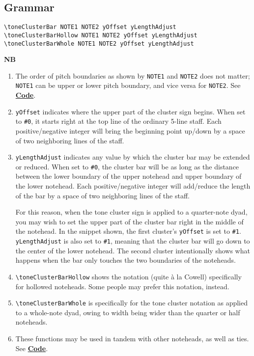 \subsection{Grammar}
\begin{verbatim}
\toneClusterBar NOTE1 NOTE2 yOffset yLengthAdjust
\toneClusterBarHollow NOTE1 NOTE2 yOffset yLengthAdjust
\toneClusterBarWhole NOTE1 NOTE2 yOffset yLengthAdjust
\end{verbatim}
\textbf{NB} \begin{enumerate}
\item The order of pitch boundaries as shown by \verb|NOTE1| and \verb|NOTE2| does not matter; \verb|NOTE1| can be upper or lower pitch boundary, and vice versa for \verb|NOTE2|. See \hyperref[sec:tone_cluster_code]{\textbf{Code}}. 
\item \verb|yOffset| indicates where the upper part of the cluster sign begins. When set to \verb|#0|, it starts right at the top line of the ordinary 5-line staff. Each positive/negative integer will bring the beginning point up/down by a space of two neighboring lines of the staff.
\item \verb|yLengthAdjust| indicates any value by which the cluster bar may be extended or reduced. When set to \verb|#0|, the cluster bar will be as long as the distance between the lower boundary of the upper notehead and upper boundary of the lower notehead. Each positive/negative integer will add/reduce the length of the bar by a space of two neighboring lines of the staff.

For this reason, when the tone cluster sign is applied to a quarter-note dyad, you may wish to set the upper part of the cluster bar right in the middle of the notehead. In the snippet shown, the first cluster's \verb|yOffset| is set to \verb|#1|.  \verb|yLengthAdjust| is also set to \verb|#1|, meaning that the cluster bar will go down to the center of the lower notehead. The second cluster intentionally shows what happens when the bar only touches the two boundaries of the noteheads.

\item \verb|\toneClusterBarHollow| shows the notation (quite à la Cowell) specifically for hollowed noteheads. Some people may prefer this notation, instead.
\item \verb|\toneClusterBarWhole| is specifically for the tone cluster notation as applied to a whole-note dyad, owing to width being wider than the quarter or half noteheads. 

\item These functions may be used in tandem with other noteheads, as well as ties. See \hyperref[sec:tone_cluster_code]{\textbf{Code}}. 

\end{enumerate}
\label{sec:tone_cluster_code}
